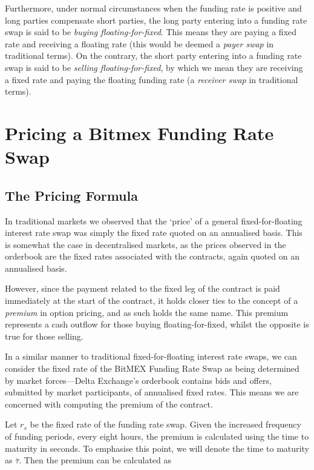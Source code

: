 Furthermore, under normal circumstances when the funding rate is positive and long parties compensate short parties, the long party entering into a funding rate swap is said to be \textit{buying floating-for-fixed}. This means they are paying a fixed rate and receiving a floating rate (this would be deemed a \textit{payer swap} in traditional terms). On the contrary, the short party entering into a funding rate swap is said to be \textit{selling floating-for-fixed}, by which we mean they are receiving a fixed rate and paying the floating funding rate (a \textit{receiver swap} in traditional terms). 

\section{Pricing a Bitmex Funding Rate Swap}

\subsection{The Pricing Formula}
In traditional markets we observed that the `price' of a general fixed-for-floating interest rate swap was simply the fixed rate quoted on an annualised basis. This is somewhat the case in decentralised markets, as the prices observed in the orderbook are the fixed rates associated with the contracts, again quoted on an annualised basis.

However, since the payment related to the fixed leg of the contract is paid immediately at the start of the contract, it holds closer ties to the concept of a \textit{premium} in option pricing, and as such holds the same name. This premium represents a cash outflow for those buying floating-for-fixed, whilst the opposite is true for those selling. 

In a similar manner to traditional fixed-for-floating interest rate swaps, we can consider the fixed rate of the BitMEX Funding Rate Swap as being determined by market forces––Delta Exchange's orderbook contains bids and offers, submitted by market participants, of annualised fixed rates. This means we are concerned with computing the premium of the contract.

Let $r_s$ be the fixed rate of the funding rate swap. Given the increased frequency of funding periods, every eight hours, the premium is calculated using the time to maturity in seconds. To emphasise this point, we will denote the time to maturity as $\bar{\tau}$. Then the premium can be calculated as

